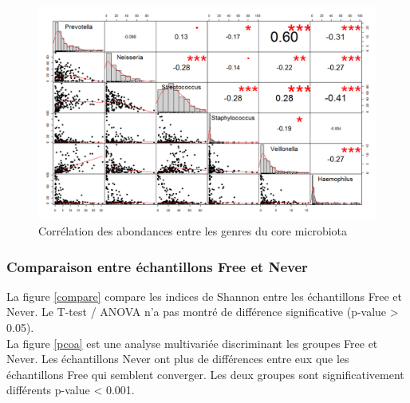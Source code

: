 \documentclass[12pt,a4paper]{article}
\begin{document}
\begin{figure}
\begin{center}
\includegraphics[scale=0.50]{img/small_correlation.png}\hfill
\end{center}
\caption{Corrélation des abondances entre les genres du core microbiota}
\label{correlation}
\end{figure}

\subsubsection{Comparaison entre échantillons Free et Never}
La figure \ref{compare} compare les indices de Shannon entre les échantillons Free et Never. Le T-test / ANOVA n'a pas montré de différence significative (p-value > 0.05). \\
La figure  \ref{pcoa} est une analyse multivariée discriminant les groupes Free et Never. Les échantillons Never ont plus de différences entre eux que les échantillons Free qui semblent converger.  Les deux groupes sont significativement différents p-value < 0.001.
\end{document}
